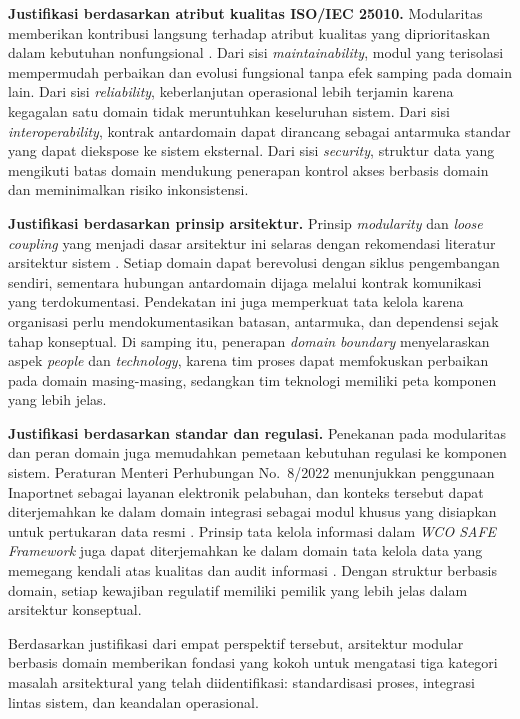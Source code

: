 \textbf{Justifikasi berdasarkan atribut kualitas ISO/IEC 25010.}
Modularitas memberikan kontribusi langsung terhadap atribut kualitas yang
diprioritaskan dalam kebutuhan nonfungsional \autocite{bass2022}. Dari sisi
\textit{maintainability}, modul yang terisolasi mempermudah perbaikan dan
evolusi fungsional tanpa efek samping pada domain lain. Dari sisi
\textit{reliability}, keberlanjutan operasional lebih terjamin karena kegagalan
satu domain tidak meruntuhkan keseluruhan sistem. Dari sisi
\textit{interoperability}, kontrak antardomain dapat dirancang sebagai
antarmuka standar yang dapat diekspose ke sistem eksternal. Dari sisi
\textit{security}, struktur data yang mengikuti batas domain mendukung
penerapan kontrol akses berbasis domain dan meminimalkan risiko inkonsistensi.

\textbf{Justifikasi berdasarkan prinsip arsitektur.}
Prinsip \textit{modularity} dan \textit{loose coupling} yang menjadi dasar
arsitektur ini selaras dengan rekomendasi literatur arsitektur sistem
\autocite{newman2015}. Setiap domain dapat berevolusi dengan siklus
pengembangan sendiri, sementara hubungan antardomain dijaga melalui kontrak
komunikasi yang terdokumentasi. Pendekatan ini juga memperkuat tata kelola
karena organisasi perlu mendokumentasikan batasan, antarmuka, dan dependensi
sejak tahap konseptual. Di samping itu, penerapan \textit{domain boundary}
menyelaraskan aspek \textit{people} dan \textit{technology}, karena tim proses
dapat memfokuskan perbaikan pada domain masing-masing, sedangkan tim teknologi
memiliki peta komponen yang lebih jelas.

\textbf{Justifikasi berdasarkan standar dan regulasi.}
Penekanan pada modularitas dan peran domain juga memudahkan pemetaan
kebutuhan regulasi ke komponen sistem. Peraturan Menteri Perhubungan No.~8/2022
menunjukkan penggunaan Inaportnet sebagai layanan elektronik pelabuhan, dan
konteks tersebut dapat diterjemahkan ke dalam domain integrasi sebagai modul
khusus yang disiapkan untuk pertukaran data resmi \autocite{kemenhub2022}.
Prinsip tata kelola informasi dalam \textit{WCO SAFE Framework}
juga dapat diterjemahkan ke dalam domain tata kelola data yang
memegang kendali atas kualitas dan audit informasi \autocite{wco2025}. Dengan
struktur berbasis domain, setiap kewajiban regulatif memiliki pemilik yang
lebih jelas dalam arsitektur konseptual.

Berdasarkan justifikasi dari empat perspektif tersebut, arsitektur modular
berbasis domain memberikan fondasi yang kokoh untuk mengatasi tiga kategori
masalah arsitektural yang telah diidentifikasi: standardisasi proses, integrasi
lintas sistem, dan keandalan operasional.

